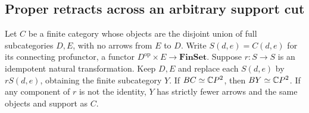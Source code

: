 \subsection{Proper retracts across an arbitrary support cut}

\begin{theorem}
\label{CP2:A-cut-retract}
Let $C$ be a finite category whose objects are the disjoint union of
full subcategories $D,E$, with no arrows from $E$ to $D$.
Write $S(d,e)=C(d,e)$ for its connecting profunctor, a functor
$D^{\mathrm{op}}\times E\to\mathbf{FinSet}$.
Suppose $r:S\to S$ is an idempotent natural transformation.
Keep $D,E$ and replace each $S(d,e)$ by $rS(d,e)$, obtaining the
finite subcategory $Y$. If $BC\simeq\mathbb{C}P^2$, then $BY\simeq\mathbb{C}P^2$.
If any component of $r$ is not the identity, $Y$ has strictly fewer
arrows and the same objects and support as $C$.
\end{theorem}
